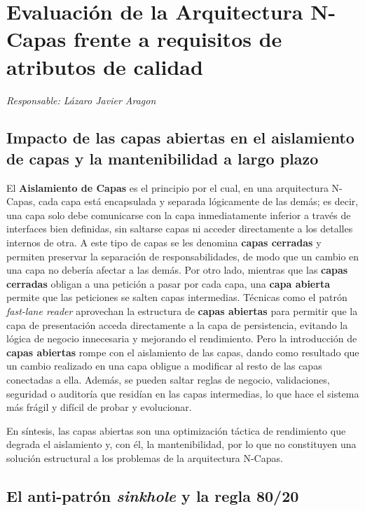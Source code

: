 \documentclass[11pt,a4paper]{article}
\newcommand{\responsable}[1]{\noindent\textit{Responsable: #1}\par\medskip}
\begin{document}
\newpage
\section{Evaluación de la Arquitectura N-Capas frente a requisitos de atributos de calidad}
\responsable{Lázaro Javier Aragon}

\subsection*{Impacto de las capas abiertas en el aislamiento de capas y la mantenibilidad a largo plazo}

El \textbf{Aislamiento de Capas} es el principio por el cual, en una arquitectura N-Capas, cada
capa está encapsulada y separada lógicamente de las demás; es decir, una capa solo debe
comunicarse con la capa inmediatamente inferior a través de interfaces bien definidas, sin
saltarse capas ni acceder directamente a los detalles internos de otra. A este tipo de capas se
les denomina \textbf{capas cerradas} y permiten preservar la separación de responsabilidades,
de modo que un cambio en una capa no debería afectar a las demás. Por otro lado, mientras que
las \textbf{capas cerradas} obligan a una petición a pasar por cada capa, una \textbf{capa
abierta} permite que las peticiones se salten capas intermedias. Técnicas como el patrón
\emph{fast-lane reader} aprovechan la estructura de \textbf{capas abiertas} para permitir que la
capa de presentación acceda directamente a la capa de persistencia, evitando la lógica de
negocio innecesaria y mejorando el rendimiento. Pero la introducción de \textbf{capas abiertas}
rompe con el aislamiento de las capas, dando como resultado que un cambio realizado en una capa
obligue a modificar al resto de las capas conectadas a ella. Además, se pueden saltar reglas de
negocio, validaciones, seguridad o auditoría que residían en las capas intermedias, lo que hace
el sistema más frágil y difícil de probar y evolucionar.

En síntesis, las capas abiertas son una optimización táctica de rendimiento que degrada el
aislamiento y, con él, la mantenibilidad, por lo que no constituyen una solución estructural a
los problemas de la arquitectura N-Capas.

\subsection*{El anti-patrón \emph{sinkhole} y la regla 80/20}
\end{document}

